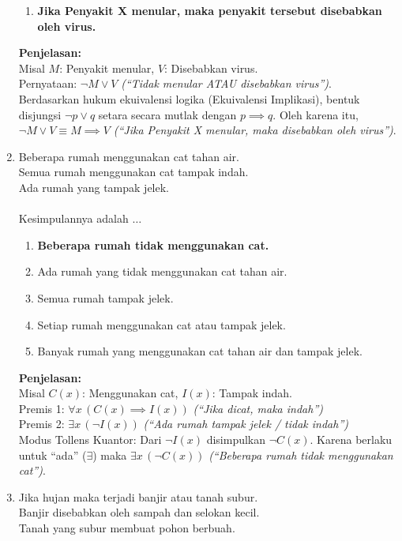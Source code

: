 \begin{multicols}{2}
\begin{enumerate}
\begin{enumerate}
    \item \textbf{Jika Penyakit X menular, maka penyakit tersebut disebabkan oleh virus.}
    \end{enumerate}
    \textbf{Penjelasan: } \\
    Misal $M$: Penyakit menular, $V$: Disebabkan virus. \\
    Pernyataan: $\neg M \lor V$ \textit{(``Tidak menular ATAU disebabkan virus'')}. \\
    Berdasarkan hukum ekuivalensi logika (Ekuivalensi Implikasi), bentuk disjungsi $\neg p \lor q$ setara secara mutlak dengan $p \implies q$. Oleh karena itu, $\neg M \lor V \equiv M \implies V$ \textit{(``Jika Penyakit X menular, maka disebabkan oleh virus'')}. 
  \item Beberapa rumah menggunakan cat tahan air. \\
    Semua rumah menggunakan cat tampak indah. \\
    Ada rumah yang tampak jelek. \\ \\
    Kesimpulannya adalah $\dots$
    \begin{enumerate}
    \item \textbf{Beberapa rumah tidak menggunakan cat.}
    \item Ada rumah yang tidak menggunakan cat tahan air.
    \item Semua rumah tampak jelek.
    \item Setiap rumah menggunakan cat atau tampak jelek.
    \item Banyak rumah yang menggunakan cat tahan air dan tampak jelek.
    \end{enumerate}
    \textbf{Penjelasan: } \\
    Misal $C(x)$: Menggunakan cat, $I(x)$: Tampak indah. \\
    Premis 1: $\forall x \, (C(x) \implies I(x))$ \textit{(``Jika dicat, maka indah'')} \\
    Premis 2: $\exists x \, (\neg I(x))$ \textit{(``Ada rumah tampak jelek / tidak indah'')} \\
    Modus Tollens Kuantor: Dari $\neg I(x)$ disimpulkan $\neg C(x)$. Karena berlaku untuk ``ada'' ($\exists$) maka $\exists x \, (\neg C(x))$ \textit{(``Beberapa rumah tidak menggunakan cat'')}.
  \item Jika hujan maka terjadi banjir atau tanah subur. \\
    Banjir disebabkan oleh sampah dan selokan kecil. \\
    Tanah yang subur membuat pohon berbuah. \\ \\

\end{enumerate}
\end{multicols}
